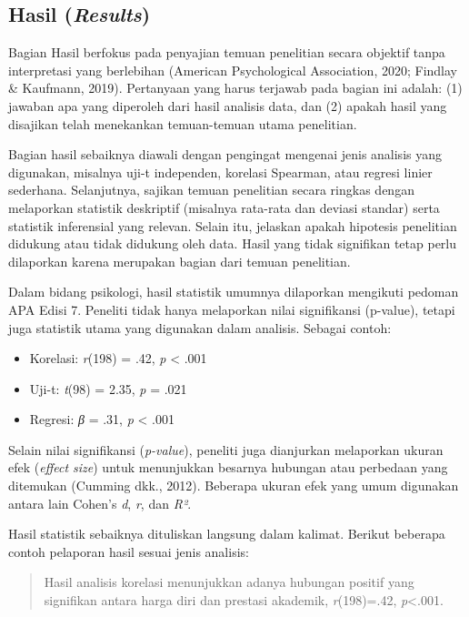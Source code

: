 \documentclass[
  indonesian,
  letterpaper,
  DIV=11,
  numbers=noendperiod]{scrreprt}
\providecommand{\tightlist}{%
  \setlength{\itemsep}{0pt}\setlength{\parskip}{0pt}}
\begin{document}
\subsection{\texorpdfstring{Hasil
(\emph{Results})}{Hasil (Results)}}\label{hasil-results}

Bagian Hasil berfokus pada penyajian temuan penelitian secara objektif
tanpa interpretasi yang berlebihan (American Psychological Association,
2020; Findlay \& Kaufmann, 2019). Pertanyaan yang harus terjawab pada
bagian ini adalah: (1) jawaban apa yang diperoleh dari hasil analisis
data, dan (2) apakah hasil yang disajikan telah menekankan temuan-temuan
utama penelitian.

Bagian hasil sebaiknya diawali dengan pengingat mengenai jenis analisis
yang digunakan, misalnya uji-t independen, korelasi Spearman, atau
regresi linier sederhana. Selanjutnya, sajikan temuan penelitian secara
ringkas dengan melaporkan statistik deskriptif (misalnya rata-rata dan
deviasi standar) serta statistik inferensial yang relevan. Selain itu,
jelaskan apakah hipotesis penelitian didukung atau tidak didukung oleh
data. Hasil yang tidak signifikan tetap perlu dilaporkan karena
merupakan bagian dari temuan penelitian.

Dalam bidang psikologi, hasil statistik umumnya dilaporkan mengikuti
pedoman APA Edisi 7. Peneliti tidak hanya melaporkan nilai signifikansi
(p-value), tetapi juga statistik utama yang digunakan dalam analisis.
Sebagai contoh:

\begin{itemize}
\tightlist
\item
  Korelasi: \emph{r}(198) = .42, \emph{p} \textless{} .001
\item
  Uji-t: \emph{t}(98) = 2.35, \emph{p} = .021
\item
  Regresi: \emph{β} = .31, \emph{p} \textless{} .001
\end{itemize}

Selain nilai signifikansi (\emph{p-value}), peneliti juga dianjurkan
melaporkan ukuran efek (\emph{effect size}) untuk menunjukkan besarnya
hubungan atau perbedaan yang ditemukan (Cumming dkk., 2012). Beberapa
ukuran efek yang umum digunakan antara lain Cohen's \emph{d}, \emph{r},
dan \emph{R²}.

Hasil statistik sebaiknya dituliskan langsung dalam kalimat. Berikut
beberapa contoh pelaporan hasil sesuai jenis analisis:

\begin{quote}
Hasil analisis korelasi menunjukkan adanya hubungan positif yang
signifikan antara harga diri dan prestasi akademik, \emph{r}(198)=.42,
\emph{p}\textless.001.
\end{quote}
\end{document}
